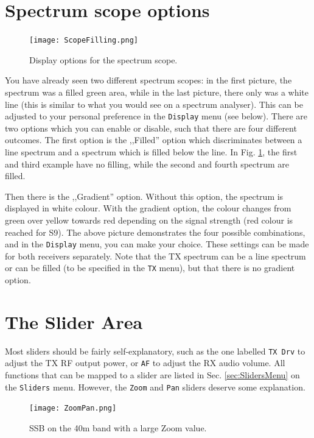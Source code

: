 \documentclass[12pt]{book}
\def\rett#1{\texttt{\color{red}#1}}
\def\bltt#1{\texttt{\color{blue}#1}}
\begin{document}
\section{Spectrum scope options}
\label{sec:FillingGradient}

\begin{figure}[ht]
\center
\texttt{[image: ScopeFilling.png]}
\caption{Display options for the spectrum scope.}
\label{fig:scopeoptions}
\end{figure}

You have already seen two different spectrum scopes: in the first
picture, the  spectrum was a filled green area, while in the last
picture, there only was a white line (this is similar to what you
would see on a spectrum analyser). This can be adjusted to your
personal preference in the \bltt{Display} menu (see below). There
are two options which you can enable or disable, such that there
are four different outcomes. The first option is the ,,Filled'' option
which discriminates between a line spectrum and a spectrum which is
filled below the line. In Fig. \ref{fig:scopeoptions}, the first and third
example have no filling, while the second and fourth spectrum
are filled.

Then there is the ,,Gradient'' option. Without this option, the
spectrum is displayed in white colour. With the gradient option,
the colour changes from green over yellow towards red depending
on the signal strength (red colour is reached for S9). The above
picture demonstrates the four possible combinations, and in
the \bltt{Display} menu, you can make your choice. These settings
can be made for both receivers separately. Note that the TX
spectrum can be a line spectrum or can be filled (to be specified
in the \bltt{TX} menu), but that there
is no gradient option.

\section{The Slider Area}
\label{sec:SliderArea}
Most sliders should be fairly self-explanatory, such as
the one labelled \rett{TX Drv} to adjust the TX RF output
power, or \rett{AF} to adjust the RX audio volume. All functions
that can be mapped to a slider are listed in Sec. \ref{sec:SlidersMenu}
on the \bltt{Sliders} menu. However, the \bltt{Zoom} and \bltt{Pan}
sliders deserve some explanation.

\begin{figure}[ht!]
\center
\texttt{[image: ZoomPan.png]}
\caption{SSB on the 40m band with a large Zoom value.}
\label{fig:zoom}
\end{figure}
\end{document}
